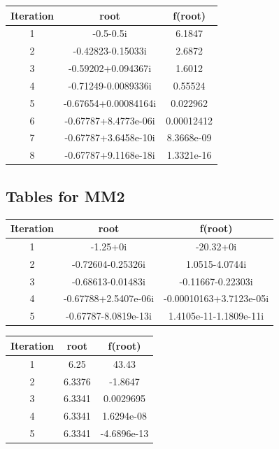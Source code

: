 \documentclass[12pt]{report}
\begin{document}
\begin{center}
  \begin{tabular}{| c  c c |}
\hline
Iteration & root         & f(root) \\
\hline
1   &       -0.5-0.5i         &         6.1847 \\
\hline
2   &   -0.42823-0.15033i     &         2.6872  \\
\hline
3   &   -0.59202+0.094367i    &        1.6012   \\
\hline
4   &  -0.71249-0.0089336i    &       0.55524  \\
\hline
5   &  -0.67654+0.00084164i   &      0.022962  \\
\hline
6    &  -0.67787+8.4773e-06i  &     0.00012412  \\
\hline
7    &  -0.67787+3.6458e-10i  &     8.3668e-09  \\
\hline
8    &  -0.67787+9.1168e-18i  &     1.3321e-16 \\
\hline

\end{tabular}
\end{center}

\subsection{Tables for MM2}
\begin{center}
  \begin{tabular}{| c  c c |}
\hline
Iteration & root         & f(root) \\
\hline
 1   &      -1.25+0i           &       -20.32+0i   \\
 \hline
 2   &  -0.72604-0.25326i      &      1.0515-4.0744i  \\
 \hline
 3   &   -0.68613-0.01483i     &     -0.11667-0.22303i  \\
 \hline
 4   &   -0.67788+2.5407e-06i  & -0.00010163+3.7123e-05i\\
 \hline
 5   &  -0.67787-8.0819e-13i   & 1.4105e-11-1.1809e-11i \\
 \hline

\end{tabular}
\end{center}

\begin{center}
  \begin{tabular}{| c  c c |}
\hline
Iteration & root         & f(root) \\
\hline
1   &     6.25  &         43.43  \\
\hline
2   &   6.3376  &       -1.8647  \\
\hline
3   &  6.3341   &    0.0029695  \\
\hline
4   &   6.3341  &    1.6294e-08  \\
\hline
5   &  6.3341   &  -4.6896e-13  \\
\hline

\end{tabular}
\end{center}
\end{document}
